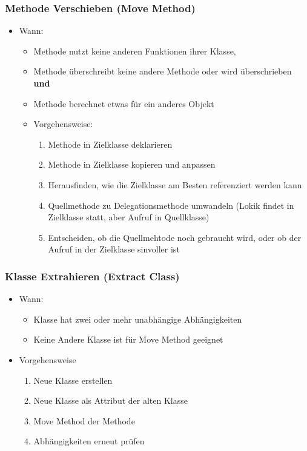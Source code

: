 \documentclass[ngerman,color=3b]{tuda_summary}
\begin{document}
\subsubsection{Methode Verschieben (Move Method)}
\begin{itemize}
    \item Wann:\begin{itemize}
              \item Methode nutzt keine anderen Funktionen ihrer Klasse,
              \item Methode überschreibt keine andere Methode oder wird überschrieben \textbf{und}
              \item Methode berechnet etwas für ein anderes Objekt
          \end{itemize}
          \begin{itemize}
              \item Vorgehensweise:\begin{enumerate}
                        \item Methode in Zielklasse deklarieren
                        \item Methode in Zielklasse kopieren und anpassen
                        \item Herausfinden, wie die Zielklasse am Besten referenziert werden kann
                        \item Quellmethode zu Delegationsmethode umwandeln (Lokik findet in Zielklasse statt, aber Aufruf in Quellklasse)
                        \item Entscheiden, ob die Quellmehtode noch gebraucht wird, oder ob der Aufruf in der Zielklasse sinvoller ist
                    \end{enumerate}
          \end{itemize}
\end{itemize}
\subsubsection{Klasse Extrahieren (Extract Class)}
\begin{itemize}
    \item Wann:\begin{itemize}
              \item Klasse hat zwei oder mehr unabhängige Abhängigkeiten
              \item Keine Andere Klasse ist für Move Method geeignet
          \end{itemize}
    \item Vorgehensweise\begin{enumerate}
              \item Neue Klasse erstellen
              \item Neue Klasse als Attribut der alten Klasse
              \item Move Method der Methode
              \item Abhängigkeiten erneut prüfen
          \end{enumerate}
\end{itemize}
\end{document}
